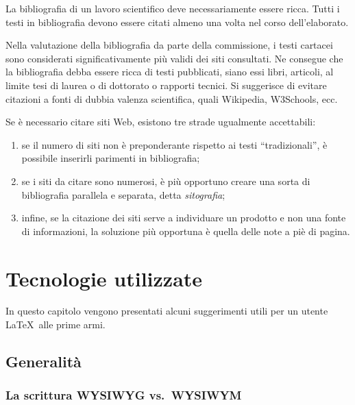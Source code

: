 \documentclass[12pt]{report}
\begin{document}
    La bibliografia di un lavoro scientifico deve necessariamente essere ricca. Tutti i testi in bibliografia devono essere citati almeno una volta nel corso dell'elaborato.

    Nella valutazione della bibliografia da parte della commissione, i testi cartacei sono considerati significativamente più validi dei siti consultati. Ne consegue che la bibliografia debba essere ricca di testi pubblicati, siano essi libri, articoli, al limite tesi di laurea o di dottorato o rapporti tecnici. Si suggerisce di evitare citazioni a fonti di dubbia valenza scientifica, quali Wikipedia, W3Schools, ecc.

    Se è necessario citare siti Web, esistono tre strade ugualmente accettabili:
    \begin{enumerate}
        \item se il numero di siti non è preponderante rispetto ai testi ``tradizionali'', è possibile inserirli parimenti in bibliografia;
        \item se i siti da citare sono numerosi, è più opportuno creare una sorta di bibliografia parallela e separata, detta \textit{sitografia};
        \item infine, se la citazione dei siti serve a individuare un prodotto e non una fonte di informazioni, la soluzione più opportuna è quella delle note a piè di pagina.
    \end{enumerate}





%
%

    \chapter{Tecnologie utilizzate}
    \label{cap3}

    In questo capitolo vengono presentati alcuni suggerimenti utili per un utente \LaTeX\ alle prime armi.


    \section{Generalit\`a}

    \subsection{La scrittura WYSIWYG vs.\ WYSIWYM}
\end{document}
